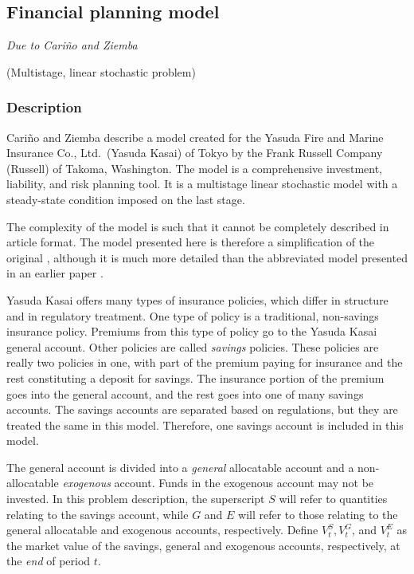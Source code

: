 \subsection{Financial planning model}%
\emph{Due to Cari\~{n}o and Ziemba \cite{carino98,carino298}}%

\noindent(Multistage, linear stochastic problem)

\vspace{3mm}
\subsubsection{Description}
Cari\~{n}o and Ziemba \cite{carino98,carino298} describe a model created for the Yasuda Fire and Marine Insurance Co., Ltd.\ (Yasuda Kasai) of Tokyo by the Frank Russell Company (Russell) of Takoma, Washington.  The model is a comprehensive investment, liability, and risk planning tool.  It is a multistage linear stochastic model with a steady-state condition imposed on the last stage.  

The complexity of the model is such that it cannot be completely described in article format.  The model presented here is therefore a simplification of the original \cite{carino98}, although it is much more detailed than the abbreviated model presented in an earlier paper \cite[Appendix]{carino94}.

Yasuda Kasai offers many types of insurance policies, which differ in structure and in regulatory treatment.   One type of policy is a traditional, non-savings insurance policy.  Premiums from this type of policy go to the Yasuda Kasai general account.  Other policies are called \emph{savings} policies.  These policies are really two policies in one, with part of the premium paying for insurance and the rest constituting a deposit for savings.  The insurance portion of the premium goes into the general account, and the rest goes into one of many savings accounts.  The savings accounts are separated based on regulations, but they are treated the same in this model.  Therefore, one savings account is included in this model.

The general account is divided into a \emph{general} allocatable account and a non-allocatable \emph{exogenous} account.  Funds in the exogenous account may not be invested.  In this problem description, the superscript $S$ will refer to quantities relating to the savings account, while $G$ and $E$ will refer to those relating to the general allocatable and exogenous accounts, respectively.  Define $V_t^S, V_t^G$, and $V_t^E$ as the market value of the savings, general and exogenous accounts, respectively, at the \emph{end} of period $t$.

